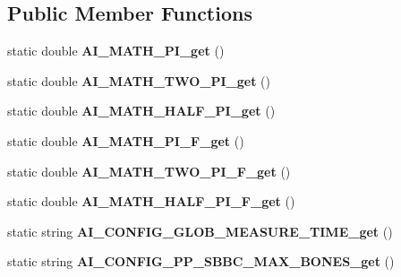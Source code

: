 \subsection*{Public Member Functions}
\begin{DoxyCompactItemize}
\item 
\hypertarget{class_assimp_p_i_n_v_o_k_e_a6299f73fa8f3b8b06e47ac7516589f54}{static double {\bfseries A\+I\+\_\+\+M\+A\+T\+H\+\_\+\+P\+I\+\_\+get} ()}\label{class_assimp_p_i_n_v_o_k_e_a6299f73fa8f3b8b06e47ac7516589f54}

\item 
\hypertarget{class_assimp_p_i_n_v_o_k_e_ae7a456c2e21c17afad33ba2d20746fb0}{static double {\bfseries A\+I\+\_\+\+M\+A\+T\+H\+\_\+\+T\+W\+O\+\_\+\+P\+I\+\_\+get} ()}\label{class_assimp_p_i_n_v_o_k_e_ae7a456c2e21c17afad33ba2d20746fb0}

\item 
\hypertarget{class_assimp_p_i_n_v_o_k_e_a7274555349903cad2253f3c334329ebb}{static double {\bfseries A\+I\+\_\+\+M\+A\+T\+H\+\_\+\+H\+A\+L\+F\+\_\+\+P\+I\+\_\+get} ()}\label{class_assimp_p_i_n_v_o_k_e_a7274555349903cad2253f3c334329ebb}

\item 
\hypertarget{class_assimp_p_i_n_v_o_k_e_aef35286d392edf80e317c4b3f1f92840}{static double {\bfseries A\+I\+\_\+\+M\+A\+T\+H\+\_\+\+P\+I\+\_\+\+F\+\_\+get} ()}\label{class_assimp_p_i_n_v_o_k_e_aef35286d392edf80e317c4b3f1f92840}

\item 
\hypertarget{class_assimp_p_i_n_v_o_k_e_a6aa8e4e8c8210fac0da027717521add3}{static double {\bfseries A\+I\+\_\+\+M\+A\+T\+H\+\_\+\+T\+W\+O\+\_\+\+P\+I\+\_\+\+F\+\_\+get} ()}\label{class_assimp_p_i_n_v_o_k_e_a6aa8e4e8c8210fac0da027717521add3}

\item 
\hypertarget{class_assimp_p_i_n_v_o_k_e_a08d094a4620ec496a400fa79e93ae324}{static double {\bfseries A\+I\+\_\+\+M\+A\+T\+H\+\_\+\+H\+A\+L\+F\+\_\+\+P\+I\+\_\+\+F\+\_\+get} ()}\label{class_assimp_p_i_n_v_o_k_e_a08d094a4620ec496a400fa79e93ae324}

\item 
\hypertarget{class_assimp_p_i_n_v_o_k_e_adaa648639ce863cd4933f23914934694}{static string {\bfseries A\+I\+\_\+\+C\+O\+N\+F\+I\+G\+\_\+\+G\+L\+O\+B\+\_\+\+M\+E\+A\+S\+U\+R\+E\+\_\+\+T\+I\+M\+E\+\_\+get} ()}\label{class_assimp_p_i_n_v_o_k_e_adaa648639ce863cd4933f23914934694}

\item 
\hypertarget{class_assimp_p_i_n_v_o_k_e_a037a57c9953d0f5a844e4c7874bdbedf}{static string {\bfseries A\+I\+\_\+\+C\+O\+N\+F\+I\+G\+\_\+\+P\+P\+\_\+\+S\+B\+B\+C\+\_\+\+M\+A\+X\+\_\+\+B\+O\+N\+E\+S\+\_\+get} ()}\label{class_assimp_p_i_n_v_o_k_e_a037a57c9953d0f5a844e4c7874bdbedf}


\end{DoxyCompactItemize}
